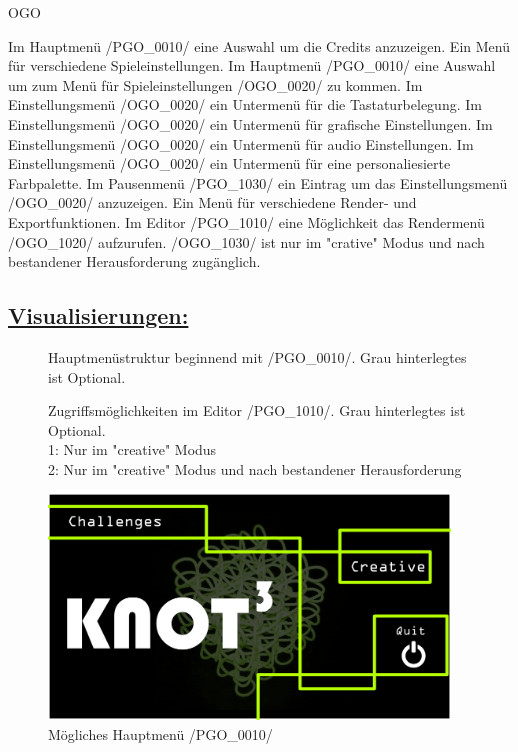 \begin{ids}{\gls{OGO}}

	\id[0010] Im Hauptmenü /PGO\_0010/ eine Auswahl um die Credits anzuzeigen.
	\id[0020] Ein Menü für verschiedene Spieleinstellungen.
	\id[0030] Im Hauptmenü /PGO\_0010/ eine Auswahl um zum Menü für Spieleinstellungen /OGO\_0020/ zu kommen.
	\id[0040] Im Einstellungsmenü /OGO\_0020/ ein Untermenü für die Tastaturbelegung.
	\id[0050] Im Einstellungsmenü /OGO\_0020/ ein Untermenü für grafische Einstellungen.
	\id[0060] Im Einstellungsmenü /OGO\_0020/ ein Untermenü für audio Einstellungen.
	\id[0070] Im Einstellungsmenü /OGO\_0020/ ein Untermenü für eine personaliesierte Farbpalette.
	\id[1010] Im Pausenmenü /PGO\_1030/ ein Eintrag um das Einstellungsmenü /OGO\_0020/ anzuzeigen.
	\id[1020] Ein Menü für verschiedene Render- und Exportfunktionen.
	\id[1030] Im Editor /PGO\_1010/ eine Möglichkeit das Rendermenü /OGO\_1020/ aufzurufen.
	\id[1040] /OGO\_1030/ ist nur im "crative" Modus und nach bestandener Herausforderung zugänglich.
\end{ids}




\subsection*{\underline{Visualisierungen:}}
	\begin{figure}[h]
		\centering
	 	
	 	\caption{Hauptmenüstruktur beginnend mit /PGO\_0010/. Grau hinterlegtes ist Optional.}
	\end{figure}

	\begin{figure}[h]
		\centering
	 	
	 	\caption{Zugriffsmöglichkeiten im Editor /PGO\_1010/. Grau hinterlegtes ist Optional. \\
			1: Nur im "creative" Modus \\
			2: Nur im "creative" Modus und nach bestandener Herausforderung}
	\end{figure}
	
	\begin{figure}[ht]
	  \centering
	  \includegraphics[width = 0.95\textwidth]{Inhalt/Nutzung/Grafiken/Grafische_Oberflaechen/01_Knot3-mainscreen.png}
	  \caption{Mögliches Hauptmenü /PGO\_0010/}
	\end{figure}

